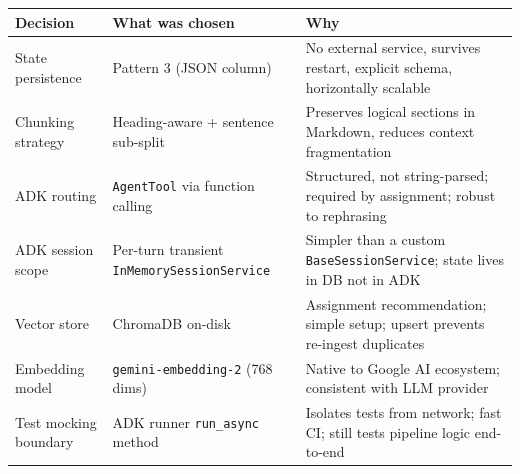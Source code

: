 \documentclass[12pt,a4paper]{article}
\begin{document}
\begin{center}
\begin{tabularx}{\textwidth}{lXX}
\toprule
\textbf{Decision} & \textbf{What was chosen} & \textbf{Why} \\
\midrule
State persistence & Pattern 3 (JSON column) & No external service, survives restart, explicit schema, horizontally scalable \\
Chunking strategy & Heading-aware + sentence sub-split & Preserves logical sections in Markdown, reduces context fragmentation \\
ADK routing & \texttt{AgentTool} via function calling & Structured, not string-parsed; required by assignment; robust to rephrasing \\
ADK session scope & Per-turn transient \texttt{InMemorySessionService} & Simpler than a custom \texttt{BaseSessionService}; state lives in DB not in ADK \\
Vector store & ChromaDB on-disk & Assignment recommendation; simple setup; upsert prevents re-ingest duplicates \\
Embedding model & \texttt{gemini-embedding-2} (768 dims) & Native to Google AI ecosystem; consistent with LLM provider \\
Test mocking boundary & ADK runner \texttt{run\_async} method & Isolates tests from network; fast CI; still tests pipeline logic end-to-end \\
\bottomrule
\end{tabularx}
\end{center}
\end{document}
